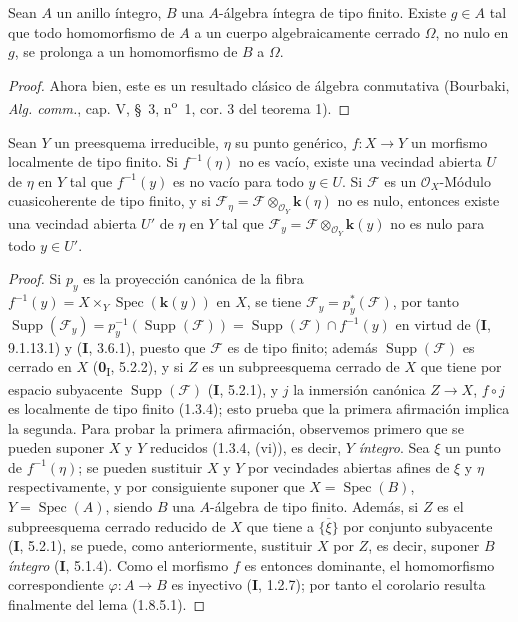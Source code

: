 \begin{lemma}[1.8.5.1]
\label{IV.1.8.5.1-fr}
Sean $A$ un anillo íntegro, $B$ una $A$-álgebra íntegra de tipo finito.
Existe $g\in A$ tal que todo homomorfismo de $A$ a un cuerpo
algebraicamente cerrado $\Omega$, no nulo en $g$, se prolonga a un homomorfismo
de $B$ a $\Omega$.
\end{lemma}

\begin{proof}
Ahora bien, este es un resultado clásico de álgebra conmutativa (Bourbaki,
\emph{Alg. comm.}, cap. V, \S~3, n\textsuperscript{o}~1, cor. 3 del teorema 1).
\end{proof}

\begin{corollary}[1.8.6]
\label{IV.1.8.6-fr}
Sean $Y$ un preesquema irreducible, $\eta$ su punto genérico,
$f:X\to Y$ un morfismo localmente de tipo finito. Si $f^{-1}(\eta)$ no es
vacío, existe una vecindad abierta $U$ de $\eta$ en $Y$ tal que
$f^{-1}(y)$ es no vacío para todo $y\in U$. Si $\mathscr F$ es un
$\mathcal O_X$-Módulo cuasicoherente de tipo finito, y si
$\mathscr F_\eta=\mathscr F\otimes_{\mathcal O_Y}\boldsymbol{k}(\eta)$ no es nulo,
entonces existe una vecindad abierta $U'$ de $\eta$ en $Y$ tal que
$\mathscr F_y=\mathscr F\otimes_{\mathcal O_Y}\boldsymbol{k}(y)$ no es nulo para
todo $y\in U'$.
\end{corollary}

\begin{proof}
Si $p_y$ es la proyección canónica de la fibra
$f^{-1}(y)=X\times_Y\operatorname{Spec}(\boldsymbol{k}(y))$ en $X$, se tiene
$\mathscr F_y=p_y^*(\mathscr F)$, por tanto
$\operatorname{Supp}(\mathscr F_y)=p_y^{-1}(\operatorname{Supp}(\mathscr F))
=\operatorname{Supp}(\mathscr F)\cap f^{-1}(y)$ en virtud de (\textbf{I}, 9.1.13.1) y
(\textbf{I}, 3.6.1), puesto que $\mathscr F$ es de tipo finito; además
$\operatorname{Supp}(\mathscr F)$ es cerrado en $X$ (\textbf{0}\textsubscript{I},
5.2.2), y si $Z$ es un subpreesquema cerrado de $X$ que tiene por espacio
subyacente $\operatorname{Supp}(\mathscr F)$ (\textbf{I}, 5.2.1), y $j$ la inmersión
canónica $Z\to X$, $f\circ j$ es localmente de tipo finito (1.3.4); esto
prueba que la primera afirmación implica la segunda. Para probar la
primera afirmación, observemos primero que se pueden suponer $X$ y $Y$
reducidos (1.3.4, (vi)), es decir, $Y$ \emph{íntegro}. Sea $\xi$ un punto de
$f^{-1}(\eta)$; se pueden sustituir $X$ y $Y$ por vecindades abiertas
afines de $\xi$ y $\eta$ respectivamente, y por consiguiente suponer que
$X=\operatorname{Spec}(B)$, $Y=\operatorname{Spec}(A)$, siendo $B$ una
$A$-álgebra de tipo finito. Además, si $Z$ es el subpreesquema cerrado reducido
de $X$ que tiene a $\overline{\{\xi\}}$ por conjunto subyacente (\textbf{I}, 5.2.1), se
puede, como anteriormente, sustituir $X$ por $Z$, es decir, suponer $B$
\emph{íntegro} (\textbf{I}, 5.1.4). Como el morfismo $f$ es entonces dominante,
el homomorfismo correspondiente $\varphi:A\to B$ es inyectivo (\textbf{I}, 1.2.7);
por tanto el corolario resulta finalmente del lema (1.8.5.1).
\end{proof}

